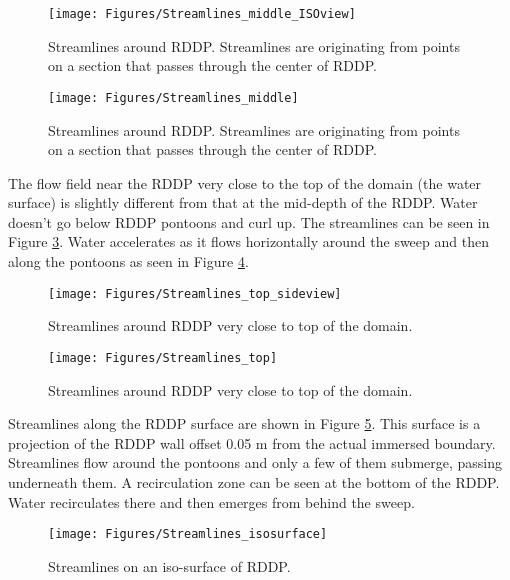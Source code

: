 \begin{figure}
\centering
\texttt{[image: Figures/Streamlines\_middle\_ISOview]}
\caption{\label{fig:Streamlines_middle_ISO}Streamlines around RDDP. Streamlines are originating from points on a section that passes through the center of RDDP.}
\end{figure}

\begin{figure}
\centering
\texttt{[image: Figures/Streamlines\_middle]}
\caption{\label{fig:Streamlines_middle}Streamlines around RDDP. Streamlines are originating from points on a section that passes through the center of RDDP.}
\end{figure}


\noindent The flow field near the RDDP very close to the top of the domain (the water surface) is slightly different from that at the mid-depth of the RDDP. Water doesn't go below RDDP pontoons and curl up. The streamlines can be seen in Figure \ref{fig:Streamlines_top_sideview}. Water accelerates as it flows horizontally around the sweep and then along the pontoons as seen in Figure \ref{fig:Streamlines_top}. 

\begin{figure}
\centering
\texttt{[image: Figures/Streamlines\_top\_sideview]}
\caption{\label{fig:Streamlines_top_sideview}Streamlines around RDDP very close to top of the domain.}
\end{figure}

\begin{figure}
\centering
\texttt{[image: Figures/Streamlines\_top]}
\caption{\label{fig:Streamlines_top}Streamlines around RDDP very close to top of the domain.}
\end{figure}

\noindent Streamlines along the RDDP surface are shown in Figure \ref{fig:Streamlines_isosurface}. This surface is a projection of the RDDP wall offset 0.05 m from the actual immersed boundary. Streamlines flow around the pontoons and only a few of them submerge, passing underneath them. A recirculation zone can be seen at the bottom of the RDDP. Water recirculates there and then emerges from behind the sweep.\\

\begin{figure}
\centering
\texttt{[image: Figures/Streamlines\_isosurface]}
\caption{\label{fig:Streamlines_isosurface}Streamlines on an iso-surface of RDDP.}
\end{figure} 


